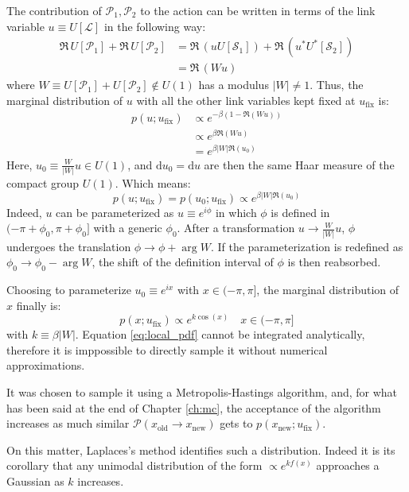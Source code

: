 The contribution of $\mathcal P_1, \mathcal P_2$ to the action can be written in terms of
the link variable $u \equiv U[\mathcal L]$ in the following way:
\[\begin{aligned}
    \Re\,U[\mathcal P_1] + \Re\,U[\mathcal P_2] &= \Re\,(uU[\mathcal S_1]) + \Re\,(u^*U^*[\mathcal S_2]) \\
                                                &= \Re\,(Wu)
\end{aligned}\]
where $W \equiv U[\mathcal P_1] + U[\mathcal P_2] \notin U(1)$ has a modulus $|W|\neq1$.
Thus, the marginal distribution of $u$ with all the other link variables kept fixed at $u_\mathrm{fix}$ is:
\[\begin{aligned}
    p(u;u_\mathrm{fix}) &\propto e^{-\beta(1-\Re(Wu))} \\
                        &\propto e^{\beta\Re(Wu)} \\
                        &= e^{\beta|W|\Re\left(u_0\right)}
\end{aligned}\]
Here, $u_0 \equiv \frac{W}{|W|}u \in U(1)$, and $\mathrm du_0=\mathrm du$ are then the same Haar measure of the compact group $U(1)$.
Which means:
\[
    p(u;u_\mathrm{fix}) = p(u_0;u_\mathrm{fix}) \propto e^{\beta|W|\Re\left(u_0\right)}
\]
Indeed, $u$ can be parameterized as $u\equiv e^{i\phi}$ in which $\phi$ is defined in $(-\pi + \phi_0, \pi + \phi_0]$ with a generic $\phi_0$.
After a transformation $u \rightarrow \frac{W}{|W|}u$, $\phi$ undergoes the translation $\phi \rightarrow \phi + \arg W$.
If the parameterization is redefined as $\phi_0 \rightarrow \phi_0 - \arg W$, the shift of the definition interval of $\phi$ is then reabsorbed.

Choosing to parameterize $u_0 \equiv e^{ix}$ with $x \in (-\pi, \pi]$,
the marginal distribution of $x$ finally is:
\begin{equation}\label{eq:local_pdf}
    p(x;u_\mathrm{fix}) \propto e^{k\cos(x)} \quad x \in (-\pi, \pi]
\end{equation}
with $k \equiv \beta|W|$.
Equation \eqref{eq:local_pdf} cannot be integrated analytically,
therefore it is imppossible to directly sample it without numerical approximations.

It was chosen to sample it using a Metropolis-Hastings algorithm,
and, for what has been said at the end of Chapter \ref{ch:mc},
the acceptance of the algorithm increases as much similar $\mathcal P(x_\mathrm{old}\to x_\mathrm{new})$ gets to $p(x_\mathrm{new};u_\mathrm{fix})$.

On this matter, Laplaces's method identifies such a distribution.
Indeed it is its corollary that any unimodal distribution of the form $\propto e^{kf(x)}$ approaches a Gaussian as $k$ increases.

